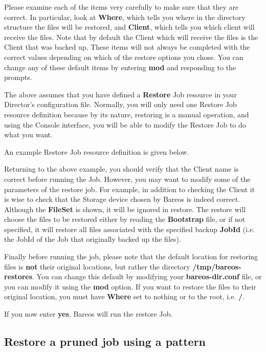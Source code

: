 Please examine each of the items very carefully to make sure that they are
correct.  In particular, look at {\bf Where}, which tells you where in the
directory structure the files will be restored, and {\bf Client}, which
tells you which client will receive the files.  Note that by default the
Client which will receive the files is the Client that was backed up.
These items will not always be completed with the correct values depending
on which of the restore options you chose.  You can change any of these
default items by entering {\bf mod} and responding to the prompts.

The above assumes that you have defined a {\bf Restore} Job resource in your
Director's configuration file. Normally, you will only need one Restore Job
resource definition because by its nature, restoring is a manual operation,
and using the Console interface, you will be able to modify the Restore Job to
do what you want.

An example Restore Job resource definition is given below.

Returning to the above example, you should verify that the Client name is
correct before running the Job. However, you may want to modify some of the
parameters of the restore job. For example, in addition to checking the Client
it is wise to check that the Storage device chosen by Bareos is indeed
correct. Although the {\bf FileSet} is shown, it will be ignored in restore.
The restore will choose the files to be restored either by reading the {\bf
Bootstrap} file, or if not specified, it will restore all files associated
with the specified backup {\bf JobId} (i.e. the JobId of the Job that
originally backed up the files).

Finally before running the job, please note that the default location for
restoring files is {\bf not} their original locations, but rather the directory
{\bf /tmp/bareos-restores}. You can change this default by modifying your {\bf
bareos-dir.conf} file, or you can modify it using the {\bf mod} option. If you
want to restore the files to their original location, you must have {\bf
Where} set to nothing or to the root, i.e. {\bf /}.

If you now enter {\bf yes}, Bareos will run the restore Job.

\subsection{Restore a pruned job using a pattern}


